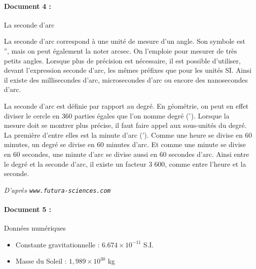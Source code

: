 \paragraph{Document 4 :}\textsf{La seconde d'arc}
\begin{center}\begin{minipage}{.9\textwidth}
La seconde d'arc correspond à une unité de mesure d'un angle. Son symbole est '', mais on peut également la noter arcsec. On l'emploie pour mesurer de très petits angles. Lorsque plus de précision est nécessaire, il est possible d'utiliser, devant l'expression seconde d'arc, les mêmes préfixes que pour les unités SI. Ainsi il existe des millisecondes d'arc, microsecondes d'arc ou encore des nanosecondes d'arc.

La seconde d'arc est définie par rapport au degré. En géométrie, on peut en effet diviser le cercle en 360 parties égales que l'on nomme degré ($ ^{\circ}$). Lorsque la mesure doit se montrer plus précise, il faut faire appel aux sous-unités du degré. La première d'entre elles est la minute d'arc ('). Comme une heure se divise en 60 minutes, un degré se divise en 60 minutes d'arc. Et comme une minute se divise en 60 secondes, une minute d'arc se divise aussi en 60 secondes d'arc. Ainsi entre le degré et la seconde d'arc, il existe un facteur 3 600, comme entre l'heure et la seconde.
\end{minipage}\end{center}
\textsl{D'après \texttt{www.futura-sciences.com}}


\paragraph{Document 5 :}\textsf{Données numériques}
\begin{itemize}
    \item Constante gravitationnelle : $6.674 \times 10^{-11}$ S.I.
    \item Masse du Soleil : $1,989 \times 10^{30}$ kg
\end{itemize}

\newpage